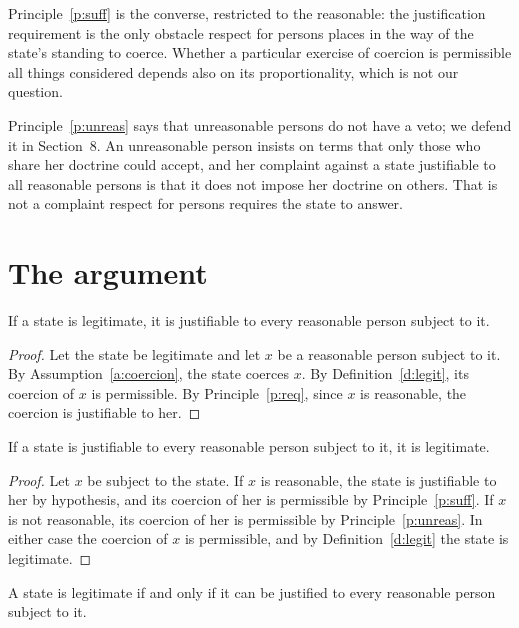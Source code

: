 \documentclass{situationist-preprint}
\begin{document}
Principle~\ref{p:suff} is the converse, restricted to the reasonable: the justification requirement is the only obstacle respect for persons places in the way of the state's standing to coerce. Whether a particular exercise of coercion is permissible all things considered depends also on its proportionality, which is not our question.

Principle~\ref{p:unreas} says that unreasonable persons do not have a veto; we defend it in Section~8. An unreasonable person insists on terms that only those who share her doctrine could accept, and her complaint against a state justifiable to all reasonable persons is that it does not impose her doctrine on others. That is not a complaint respect for persons requires the state to answer.

\section{The argument}

\begin{lemma}[Necessity]\label{l:nec}
If a state is legitimate, it is justifiable to every reasonable person subject to it.
\end{lemma}

\begin{proof}
Let the state be legitimate and let $x$ be a reasonable person subject to it. By Assumption~\ref{a:coercion}, the state coerces $x$. By Definition~\ref{d:legit}, its coercion of $x$ is permissible. By Principle~\ref{p:req}, since $x$ is reasonable, the coercion is justifiable to her.
\end{proof}

\begin{lemma}[Sufficiency]\label{l:suff}
If a state is justifiable to every reasonable person subject to it, it is legitimate.
\end{lemma}

\begin{proof}
Let $x$ be subject to the state. If $x$ is reasonable, the state is justifiable to her by hypothesis, and its coercion of her is permissible by Principle~\ref{p:suff}. If $x$ is not reasonable, its coercion of her is permissible by Principle~\ref{p:unreas}. In either case the coercion of $x$ is permissible, and by Definition~\ref{d:legit} the state is legitimate.
\end{proof}

\begin{theorem}\label{t:main}
A state is legitimate if and only if it can be justified to every reasonable person subject to it.
\end{theorem}
\end{document}
